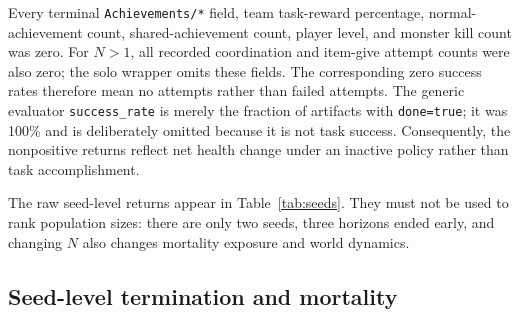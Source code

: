 \documentclass[11pt]{article}
\newcommand{\code}[1]{\texttt{#1}}
\begin{document}
\begin{table}[ht]
\centering
\scriptsize
{}
\caption{Source-style performance summary for the scripted \code{Noop}
episodes.  Alive-step percentage is recorded only for $N>1$ and divides live
agent-steps by configured-agent steps actually executed.  ``Deaths / slots''
divides terminal recorded deaths by the $2N$ configured-agent episode slots.
Both are descriptive exposure, not population effects.}
\label{tab:performance}
\end{table}

Every terminal \code{Achievements/*} field, team task-reward percentage,
normal-achievement count, shared-achievement count, player level, and monster
kill count was zero.  For $N>1$, all recorded coordination and item-give
attempt counts were also zero; the solo wrapper omits these fields.  The
corresponding zero success rates therefore mean no attempts rather than failed
attempts.  The generic evaluator \code{success\_rate} is merely the fraction of
artifacts with \code{done=true}; it was 100\% and is deliberately omitted
because it is not task success.  Consequently, the nonpositive returns reflect
net health change under an inactive policy rather than task accomplishment.

The raw seed-level returns appear in Table~\ref{tab:seeds}.  They must not be
used to rank population sizes: there are only two seeds, three horizons ended
early, and changing $N$ also changes mortality exposure and world dynamics.

\subsection{Seed-level termination and mortality}
\end{document}
